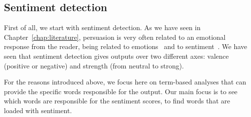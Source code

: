\subsection{\statusorange Sentiment detection}
\label{ssec:lp_techniques_sentiment}

First of all, we start with sentiment detection.
As we have seen in Chapter~\ref{chap:literature}, persuasion is very often related to an emotional response from the reader, being related to emotions~\citep{rocklage2018persuasion,petty2015emotion,desteno2004discrete} and to sentiment~\citep{gatti2014sentiment}.
We have seen that sentiment detection gives outputs over two different axes: valence (positive or negative) and strength (from neutral to strong).

For the reasons introduced above, we focus here on term-based analyses that
can provide the specific words responsible for the output.
Our main focus is to see which words are responsible for the sentiment scores, %
to find words that are loaded with sentiment. %

